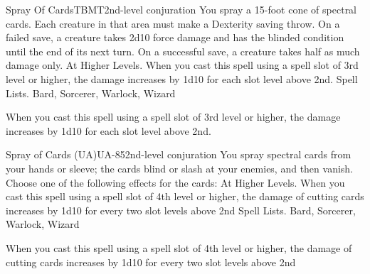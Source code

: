 \begin{spell}{Spray Of Cards}{TBMT}{2nd-level conjuration}
{
}
You spray a 15-foot cone of spectral cards. Each creature in that area must make a Dexterity saving throw. On a failed save, a creature takes 2d10 force damage and has the blinded condition until the end of its next turn. On a successful save, a creature takes half as much damage only.
At Higher Levels. When you cast this spell using a spell slot of 3rd level or higher, the damage increases by 1d10 for each slot level above 2nd.
Spell Lists. Bard, Sorcerer, Warlock, Wizard

 When you cast this spell using a spell slot of 3rd level or higher, the damage increases by 1d10 for each slot level above 2nd.
\end{spell}

\begin{spell}{Spray of Cards (UA)}{UA-85}{2nd-level conjuration}
{
}
You spray spectral cards from your hands or sleeve; the cards blind or slash at your enemies, and then vanish. Choose one of the following effects for the cards:
At Higher Levels. When you cast this spell using a spell slot of 4th level or higher, the damage of cutting cards increases by 1d10 for every two slot levels above 2nd
Spell Lists. Bard, Sorcerer, Warlock, Wizard

 When you cast this spell using a spell slot of 4th level or higher, the damage of cutting cards increases by 1d10 for every two slot levels above 2nd
\end{spell}

